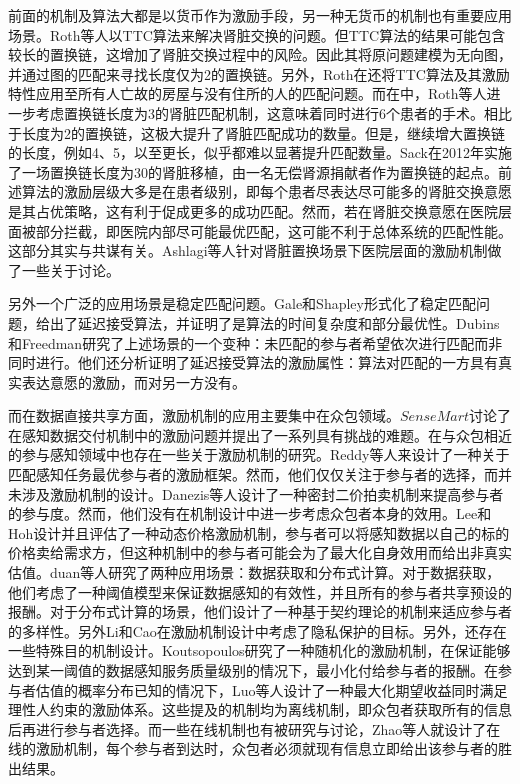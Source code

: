 \documentclass[promaster]{thesis-uestc}
\begin{document}
前面的机制及算法大都是以货币作为激励手段，另一种无货币的机制也有重要应用场景。Roth等人以TTC算法来解决肾脏交换的问题。但TTC算法的结果可能包含较长的置换链，这增加了肾脏交换过程中的风险。因此其将原问题建模为无向图，并通过图的匹配来寻找长度仅为2的置换链\cite{roth2005pairwise}。另外，Roth在\cite{roth2004kidney}还将TTC算法及其激励特性应用至所有人亡故的房屋与没有住所的人的匹配问题。而在\cite{roth2007efficient}中，Roth等人进一步考虑置换链长度为3的肾脏匹配机制，这意味着同时进行6个患者的手术。相比于长度为2的置换链，这极大提升了肾脏匹配成功的数量。但是，继续增大置换链的长度，例如4、5，以至更长，似乎都难以显著提升匹配数量。Sack在2012年实施了一场置换链长度为30的肾脏移植，由一名无偿肾源捐献者作为置换链的起点。前述算法的激励层级大多是在患者级别，即每个患者尽表达尽可能多的肾脏交换意愿是其占优策略，这有利于促成更多的成功匹配。然而，若在肾脏交换意愿在医院层面被部分拦截，即医院内部尽可能最优匹配，这可能不利于总体系统的匹配性能。这部分其实与共谋有关。Ashlagi等人针对肾脏置换场景下医院层面的激励机制做了一些关于讨论。

另外一个广泛的应用场景是稳定匹配问题。Gale和Shapley形式化了稳定匹配问题，给出了延迟接受算法，并证明了是算法的时间复杂度和部分最优性。Dubins和Freedman研究了上述场景的一个变种：未匹配的参与者希望依次进行匹配而非同时进行。他们还分析证明了延迟接受算法的激励属性：算法对匹配的一方具有真实表达意愿的激励，而对另一方没有。

而在数据直接共享方面，激励机制的应用主要集中在众包领域。$SenseMart$\cite{chou2007sensing}讨论了在感知数据交付机制中的激励问题并提出了一系列具有挑战的难题。在与众包相近的参与感知领域中也存在一些关于激励机制的研究。Reddy等人来设计了一种关于匹配感知任务最优参与者的激励框架。然而，他们仅仅关注于参与者的选择，而并未涉及激励机制的设计。Danezis等人设计了一种密封二价拍卖机制来提高参与者的参与度。然而，他们没有在机制设计中进一步考虑众包者本身的效用。Lee和Hoh设计并且评估了一种动态价格激励机制，参与者可以将感知数据以自己的标的价格卖给需求方，但这种机制中的参与者可能会为了最大化自身效用而给出非真实估值。duan等人研究了两种应用场景：数据获取和分布式计算。对于数据获取，他们考虑了一种阈值模型来保证数据感知的有效性，并且所有的参与者共享预设的报酬。对于分布式计算的场景，他们设计了一种基于契约理论的机制来适应参与者的多样性。另外Li和Cao在激励机制设计中考虑了隐私保护的目标。另外，还存在一些特殊目的机制设计。Koutsopoulos研究了一种随机化的激励机制，在保证能够达到某一阈值的数据感知服务质量级别的情况下，最小化付给参与者的报酬。在参与者估值的概率分布已知的情况下，Luo等人设计了一种最大化期望收益同时满足理性人约束的激励体系。这些提及的机制均为离线机制，即众包者获取所有的信息后再进行参与者选择。而一些在线机制也有被研究与讨论，Zhao等人就设计了在线的激励机制，每个参与者到达时，众包者必须就现有信息立即给出该参与者的胜出结果。
\end{document}
